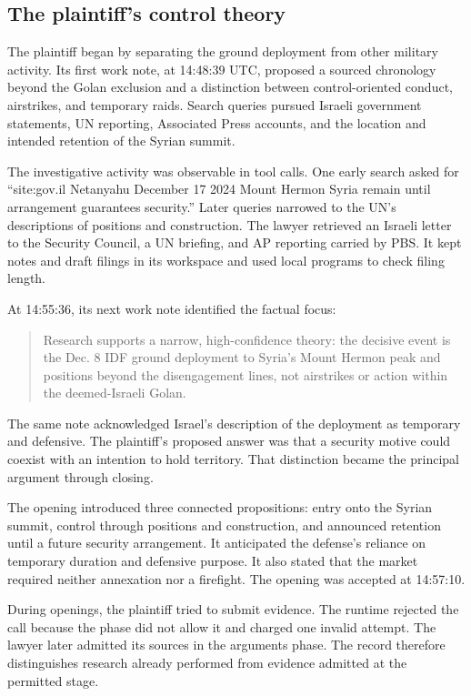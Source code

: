 \documentclass[11pt]{article}
\begin{document}
\subsection{The plaintiff's control theory}

The plaintiff began by separating the ground deployment from other military activity.  Its first work note, at 14:48:39 UTC, proposed a sourced chronology beyond the Golan exclusion and a distinction between control-oriented conduct, airstrikes, and temporary raids.  Search queries pursued Israeli government statements, UN reporting, Associated Press accounts, and the location and intended retention of the Syrian summit.

The investigative activity was observable in tool calls.  One early search asked for ``site:gov.il Netanyahu December 17 2024 Mount Hermon Syria remain until arrangement guarantees security.''  Later queries narrowed to the UN's descriptions of positions and construction.  The lawyer retrieved an Israeli letter to the Security Council, a UN briefing, and AP reporting carried by PBS.  It kept notes and draft filings in its workspace and used local programs to check filing length.

At 14:55:36, its next work note identified the factual focus:
\begin{quote}
Research supports a narrow, high-confidence theory: the decisive event is the Dec. 8 IDF ground deployment to Syria's Mount Hermon peak and positions beyond the disengagement lines, not airstrikes or action within the deemed-Israeli Golan.
\end{quote}
The same note acknowledged Israel's description of the deployment as temporary and defensive.  The plaintiff's proposed answer was that a security motive could coexist with an intention to hold territory.  That distinction became the principal argument through closing.

The opening introduced three connected propositions: entry onto the Syrian summit, control through positions and construction, and announced retention until a future security arrangement.  It anticipated the defense's reliance on temporary duration and defensive purpose.  It also stated that the market required neither annexation nor a firefight.  The opening was accepted at 14:57:10.

During openings, the plaintiff tried to submit evidence.  The runtime rejected the call because the phase did not allow it and charged one invalid attempt.  The lawyer later admitted its sources in the arguments phase.  The record therefore distinguishes research already performed from evidence admitted at the permitted stage.
\end{document}
